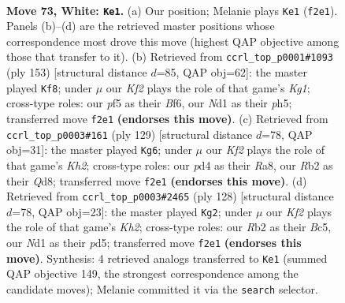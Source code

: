 \documentclass[11pt]{article}
\begin{document}
\clearpage

\begin{figure}[p]\centering
\begin{subfigure}{0.46\textwidth}\centering
\resizebox{\linewidth}{!}{%
\newchessgame
\chessboard[
  setfen={r7/q3b3/5nk1/P1p2p2/3p1Pp1/8/QR1BPK2/3N4 w - - 6 73},
  showmover=false,
  pgfstyle=straightmove, color=movearrow, markmove={f2-e1}
]}
\caption{}
\end{subfigure}\hfill
\begin{subfigure}{0.46\textwidth}\centering
\resizebox{\linewidth}{!}{%
\newchessgame
\chessboard[
  setfen={3r2k1/3q1pp1/5b1p/1p3P1P/1P6/PB2RQPK/8/8 b - - 48 77},
  showmover=false,
  pgfstyle=straightmove, color=movearrow, markmove={g8-f8}
]}
\caption{}
\end{subfigure}
\\[4pt]
\begin{subfigure}{0.46\textwidth}\centering
\resizebox{\linewidth}{!}{%
\newchessgame
\chessboard[
  setfen={r2q4/1R3p1k/3p4/3P1b2/2BQ1P1p/3P4/6PK/8 b - - 5 65},
  showmover=false,
  pgfstyle=straightmove, color=movearrow, markmove={h7-g6}
]}
\caption{}
\end{subfigure}\hfill
\begin{subfigure}{0.46\textwidth}\centering
\resizebox{\linewidth}{!}{%
\newchessgame
\chessboard[
  setfen={r3q1k1/6bp/4p1p1/1pBpP3/1P5P/2P3P1/5R1K/5Q2 w - - 43 65},
  showmover=false,
  pgfstyle=straightmove, color=movearrow, markmove={h2-g2}
]}
\caption{}
\end{subfigure}
\caption{\textbf{Move 73, White: \texttt{Ke1}.} (a) Our position; Melanie plays \texttt{Ke1} (\texttt{f2e1}). Panels (b)--(d) are the retrieved master positions whose correspondence most drove this move (highest QAP objective among those that transfer to it). (b) Retrieved from \texttt{ccrl\_top\_p0001\#1093} (ply 153) [structural distance $d$=85, QAP obj=62]: the master played \texttt{Kf8}; under $\mu$ our \emph{Kf2} plays the role of that game's \emph{Kg1}; cross-type roles: our \emph{p}f5 as their \emph{B}f6, our \emph{N}d1 as their \emph{p}h5; transferred move \texttt{f2e1} \textbf{(endorses this move)}. (c) Retrieved from \texttt{ccrl\_top\_p0003\#161} (ply 129) [structural distance $d$=78, QAP obj=31]: the master played \texttt{Kg6}; under $\mu$ our \emph{Kf2} plays the role of that game's \emph{Kh2}; cross-type roles: our \emph{p}d4 as their \emph{R}a8, our \emph{R}b2 as their \emph{Q}d8; transferred move \texttt{f2e1} \textbf{(endorses this move)}. (d) Retrieved from \texttt{ccrl\_top\_p0003\#2465} (ply 128) [structural distance $d$=78, QAP obj=23]: the master played \texttt{Kg2}; under $\mu$ our \emph{Kf2} plays the role of that game's \emph{Kh2}; cross-type roles: our \emph{R}b2 as their \emph{B}c5, our \emph{N}d1 as their \emph{p}d5; transferred move \texttt{f2e1} \textbf{(endorses this move)}. Synthesis: 4 retrieved analogs transferred to \texttt{Ke1} (summed QAP objective 149, the strongest correspondence among the candidate moves); Melanie committed it via the \texttt{search} selector.}
\label{fig:thought-m144}
\end{figure}
\end{document}
